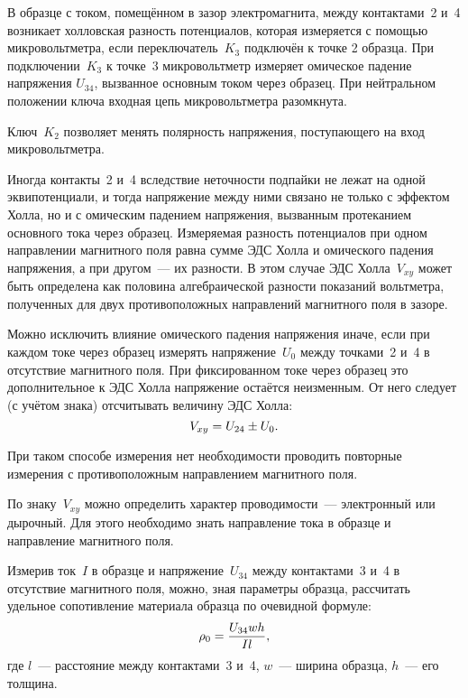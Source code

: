 В образце с током, помещённом в зазор электромагнита, между контактами~2 и~4
возникает холловская разность потенциалов, которая измеряется с помощью
микровольтметра, если переключатель~$K_3$ подключён к точке 2 образца. При
подключении~$K_3$ к точке~3 микровольтметр измеряет омическое падение напряжения
$U_{34}$, вызванное основным током через образец. При нейтральном положении
ключа входная цепь микровольтметра разомкнута.

Ключ~$K_2$ позволяет менять полярность напряжения, поступающего на вход
микровольтметра.

Иногда контакты~2 и~4 вследствие неточности подпайки не лежат на одной
эквипотенциали, и тогда напряжение между ними связано не только с эффектом
Холла, но и с омическим падением напряжения, вызванным протеканием основного
тока через образец. Измеряемая разность потенциалов при одном направлении
магнитного поля равна сумме ЭДС Холла и омического падения напряжения, а при
другом~--- их разности. В этом случае ЭДС Холла~$V_{xy}$ может быть определена
как половина алгебраической разности показаний вольтметра, полученных для двух
противоположных направлений магнитного поля в зазоре.

Можно исключить влияние омического падения напряжения иначе, если при каждом
токе через образец измерять
напряжение~$U_0$ между точками~2 и~4 в отсутствие магнитного поля. При
фиксированном токе через образец это
дополнительное к ЭДС Холла напряжение остаётся неизменным. От него следует (с
учётом знака) отсчитывать величину ЭДС Холла:
\begin{equation}
	V_{xy}=U_{24}\pm U_0.
	\eqmark{3.5.1}
\end{equation}

При таком способе измерения нет необходимости проводить повторные измерения с
противоположным направлением магнитного поля.

По знаку~$V_{xy}$ можно определить характер проводимости~--- электронный или
дырочный. Для этого необходимо знать направление тока в образце и направление
магнитного поля.

Измерив ток~$I$ в образце и напряжение~$U_{34}$ между контактами~3 и~4 в
отсутствие магнитного поля, можно, зная параметры образца, рассчитать удельное
сопотивление материала образца по очевидной формуле:
\begin{equation}
	\rho_0=\frac{U_{34}wh}{Il},
	\eqmark{3.5.2}
\end{equation}
где $l$~--- расстояние между контактами~3 и~4, $w$~--- ширина образца, $h$~---
его толщина.

